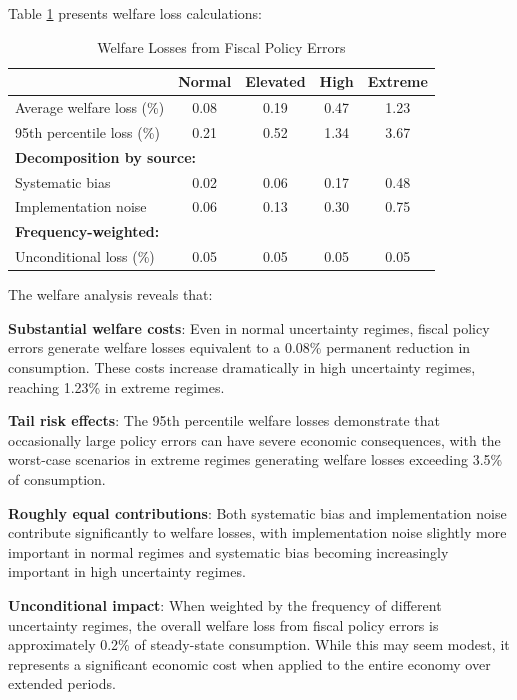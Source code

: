 \documentclass[5p,authoryear]{elsarticle}
\begin{document}
Table \ref{tab:welfare_losses} presents welfare loss calculations:

\begin{table}[h!]
\centering
\caption{Welfare Losses from Fiscal Policy Errors}
\label{tab:welfare_losses}
\begin{tabular}{lcccc}
\toprule
& Normal & Elevated & High & Extreme \\
\midrule
Average welfare loss (\%) & 0.08 & 0.19 & 0.47 & 1.23 \\
95th percentile loss (\%) & 0.21 & 0.52 & 1.34 & 3.67 \\
\midrule
\multicolumn{5}{l}{\textbf{Decomposition by source:}} \\
Systematic bias & 0.02 & 0.06 & 0.17 & 0.48 \\
Implementation noise & 0.06 & 0.13 & 0.30 & 0.75 \\
\midrule
\multicolumn{5}{l}{\textbf{Frequency-weighted:}} \\
Unconditional loss (\%) & 0.05 & 0.05 & 0.05 & 0.05 \\
\bottomrule
\end{tabular}
\end{table}

The welfare analysis reveals that:

\textbf{Substantial welfare costs}: Even in normal uncertainty regimes, fiscal policy errors generate welfare losses equivalent to a 0.08\% permanent reduction in consumption. These costs increase dramatically in high uncertainty regimes, reaching 1.23\% in extreme regimes.

\textbf{Tail risk effects}: The 95th percentile welfare losses demonstrate that occasionally large policy errors can have severe economic consequences, with the worst-case scenarios in extreme regimes generating welfare losses exceeding 3.5\% of consumption.

\textbf{Roughly equal contributions}: Both systematic bias and implementation noise contribute significantly to welfare losses, with implementation noise slightly more important in normal regimes and systematic bias becoming increasingly important in high uncertainty regimes.

\textbf{Unconditional impact}: When weighted by the frequency of different uncertainty regimes, the overall welfare loss from fiscal policy errors is approximately 0.2\% of steady-state consumption. While this may seem modest, it represents a significant economic cost when applied to the entire economy over extended periods.
\end{document}
